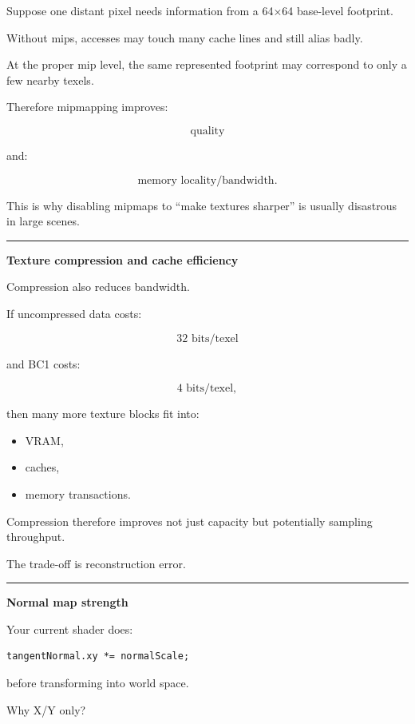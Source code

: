 Suppose one distant pixel needs information from a 64×64 base-level footprint.

Without mips, accesses may touch many cache lines and still alias badly.

At the proper mip level, the same represented footprint may correspond to only a few nearby texels.

Therefore mipmapping improves:

\[
\text{quality}
\]

and:

\[
\text{memory locality/bandwidth}.
\]

This is why disabling mipmaps to ``make textures sharper'' is usually disastrous in large scenes.

\begin{center}\rule{0.5\linewidth}{0.5pt}\end{center}

\textbf{Texture compression and cache efficiency}

Compression also reduces bandwidth.

If uncompressed data costs:

\[
32\text{ bits/texel}
\]

and BC1 costs:

\[
4\text{ bits/texel},
\]

then many more texture blocks fit into:

\begin{itemize}
\tightlist
\item
  VRAM,
\item
  caches,
\item
  memory transactions.
\end{itemize}

Compression therefore improves not just capacity but potentially sampling throughput.

The trade-off is reconstruction error.

\begin{center}\rule{0.5\linewidth}{0.5pt}\end{center}

\textbf{Normal map strength}

Your current shader does:

\begin{verbatim}
tangentNormal.xy *= normalScale;
\end{verbatim}

before transforming into world space.

Why X/Y only?

